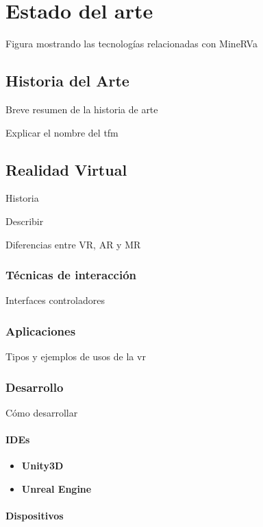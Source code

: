 \chapter{Estado del arte}
\label{chap:estado_arte}

Figura mostrando las tecnologías relacionadas con MineRVa

\section{Historia del Arte}

Breve resumen de la historia de arte

Explicar el nombre del tfm

\section{Realidad Virtual}

Historia

Describir

Diferencias entre VR, AR y MR

\subsection{Técnicas de interacción}

Interfaces
controladores

\subsection{Aplicaciones}

Tipos y ejemplos de usos de la vr

\subsection{Desarrollo}

Cómo desarrollar

\subsubsection{IDEs}

\begin{itemize}
    \item \textbf{Unity3D}
    \item \textbf{Unreal Engine}
\end{itemize}

\subsubsection{Dispositivos}

